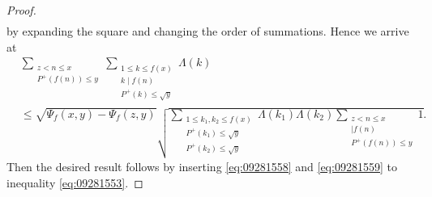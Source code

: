 \documentclass[a4paper,11pt]{amsart}
\theoremstyle{definition}
\numberwithin{equation}{section}
\begin{document}
\begin{proof}
\begin{align*}
\end{align*}
by expanding the square and changing the order of summations. 
Hence we arrive at
\begin{align}\label{eq:09281559}
&\sum_{\substack{z<n \leq x \\ P^+(f(n)) \leq y}} 
\sum_{\substack{1 \leq k \leq f(x) \\ k \mid f(n) \\ P^+(k) \leq \sqrt{y}}} \Lambda(k) \\
&\leq \sqrt{\Psi_f(x,y)-\Psi_f(z,y)}
\sqrt{\sum_{\substack{1 \leq k_1,k_2 \leq f(x) \\ P^+(k_1) \leq \sqrt{y} \\ P^+(k_2) \leq \sqrt{y}}} \Lambda(k_1) \Lambda(k_2)
\sum_{\substack{z<n \leq x \\ [k_1,k_2] \mid f(n) \\ P^+(f(n)) \leq y}} 1}. \nonumber 
\end{align}
Then the desired result follows by inserting \eqref{eq:09281558} and \eqref{eq:09281559} to inequality \eqref{eq:09281553}. 
\end{proof}
\end{document}
